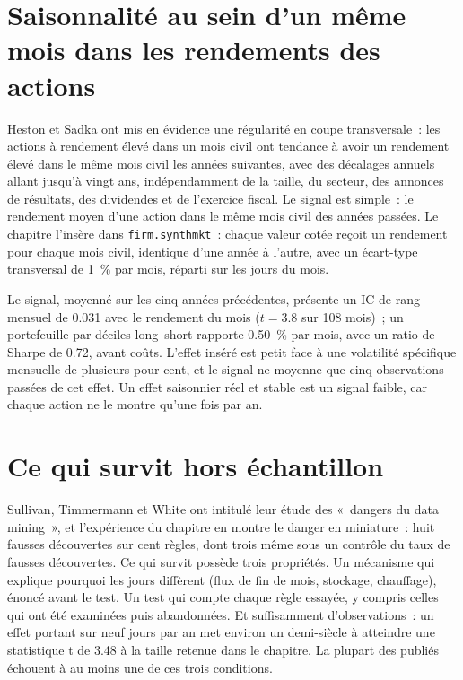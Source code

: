 \section{Saisonnalité au sein d'un même mois dans les rendements des actions}

Heston et Sadka ont mis en évidence une régularité en coupe transversale~: les actions à rendement élevé dans un mois civil ont tendance à avoir un rendement élevé dans le même mois civil
les années suivantes, avec des décalages annuels allant jusqu'à vingt ans, indépendamment de la taille, du secteur, des annonces de résultats, des dividendes et de l'exercice fiscal. Le signal est
simple~: le rendement moyen d'une action dans le même mois civil des années passées. Le chapitre l'insère dans \texttt{firm.synthmkt}~: chaque valeur cotée reçoit un
rendement pour chaque mois civil, identique d'une année à l'autre, avec un écart-type transversal de 1~\% par mois, réparti sur les jours du mois.

Le signal, moyenné sur les cinq années précédentes, présente un IC de rang mensuel de 0.031 avec le rendement du mois ($t = 3.8$ sur 108 mois)~; un portefeuille par déciles
long--short rapporte 0.50~\% par mois, avec un ratio de Sharpe de 0.72, avant coûts. L'effet inséré est petit face à une volatilité spécifique mensuelle de plusieurs
pour cent, et le signal ne moyenne que cinq observations passées de cet effet. Un effet saisonnier réel et stable est un signal faible, car chaque action ne le montre qu'une fois par an.

\section{Ce qui survit hors échantillon}

Sullivan, Timmermann et White ont intitulé leur étude des  «~dangers du data mining~», et l'expérience du chapitre en montre le danger en
miniature~: huit fausses découvertes sur cent règles, dont trois même sous un contrôle du taux de fausses découvertes. Ce qui survit possède trois propriétés. Un mécanisme
qui explique pourquoi les jours diffèrent (flux de fin de mois, stockage, chauffage), énoncé avant le test. Un test qui compte chaque règle essayée, y compris celles qui
ont été examinées puis abandonnées. Et suffisamment d'observations~: un effet portant sur neuf jours par an met environ un demi-siècle à atteindre une statistique t de 3.48 à la
taille retenue dans le chapitre. La plupart des  publiés échouent à au moins une de ces trois conditions.

